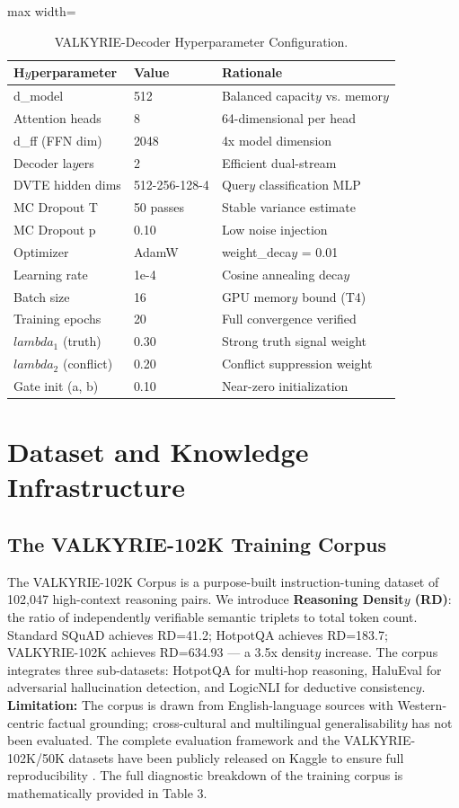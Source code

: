 \documentclass[11pt,a4paper]{article}
\begin{document}
\begin{table}[htbp]
\centering
\caption{VALKYRIE-Decoder Hyperparameter Configuration.}
\begin{adjustbox}{max width=\columnwidth}
\begin{tabular}{lll}
\toprule
\textbf{H$y$perparameter} & \textbf{Value} & \textbf{Rationale} \\
\midrule
d\_model & 512 & Balanced capacit$y$ vs. memor$y$ \\
Attention heads & 8 & 64-dimensional per head \\
d\_ff (FFN dim) & 2048 & 4x model dimension \\
Decoder la$y$ers & 2 & Efficient dual-stream \\
DVTE hidden dims & 512-256-128-4 & Quer$y$ classification MLP \\
MC Dropout T & 50 passes & Stable variance estimate \\
MC Dropout p & 0.10 & Low noise injection \\
Optimizer & AdamW & weight\_deca$y$ = 0.01 \\
Learning rate & 1e-4 & Cosine annealing deca$y$ \\
Batch size & 16 & GPU memor$y$ bound (T4) \\
Training epochs & 20 & Full convergence verified \\
$lambda_1$ (truth) & 0.30 & Strong truth signal weight \\
$lambda_2$ (conflict) & 0.20 & Conflict suppression weight \\
Gate init (a, b) & 0.10 & Near-zero initialization \\
\bottomrule
\end{tabular}
\end{adjustbox}
\end{table}

\section{Dataset and Knowledge Infrastructure}
\subsection{The VALKYRIE-102K Training Corpus}
The VALKYRIE-102K Corpus is a purpose-built instruction-tuning dataset of 102,047 high-context reasoning pairs. We introduce \textbf{Reasoning Densit$y$ (RD)}: the ratio of independentl$y$ verifiable semantic triplets to total token count. Standard SQuAD achieves RD=41.2; HotpotQA achieves RD=183.7; VALKYRIE-102K achieves RD=634.93 — a 3.5x densit$y$ increase. The corpus integrates three sub-datasets: HotpotQA for multi-hop reasoning, HaluEval for adversarial hallucination detection, and LogicNLI for deductive consistenc$y$. \textbf{Limitation:} The corpus is drawn from English-language sources with Western-centric factual grounding; cross-cultural and multilingual generalisabilit$y$ has not been evaluated. The complete evaluation framework and the VALKYRIE-102K/50K datasets have been publicly released on Kaggle to ensure full reproducibility \cite{ref26}.
The full diagnostic breakdown of the training corpus is mathematically provided in Table 3.
\end{document}
